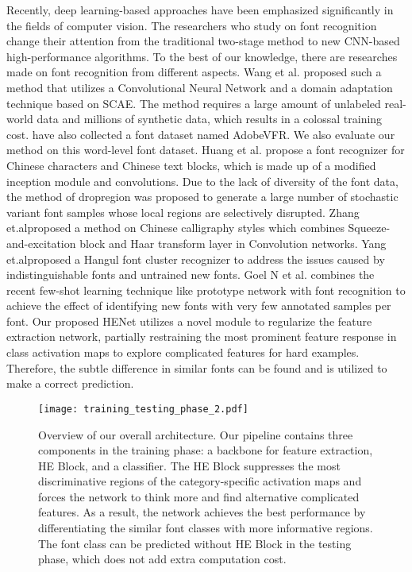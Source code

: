 \documentclass[manuscript,screen]{acmart}
\begin{document}
Recently, deep learning-based approaches have been emphasized significantly in the fields of computer vision. The researchers who study on font recognition change their attention from the traditional two-stage method to new CNN-based high-performance algorithms. To the best of our knowledge, there are researches made on font recognition from different aspects. Wang et al. \cite{wang_deepfont_2015} proposed such a method that utilizes a Convolutional Neural Network and a domain adaptation technique based on SCAE. The method requires a large amount of unlabeled real-world data and millions of synthetic data, which results in a colossal training cost. \cite{wang_deepfont_2015} have also collected a font dataset named AdobeVFR. We also evaluate our method on this word-level font dataset. Huang et al. \cite{huang_dropregion_2018} propose a font recognizer for Chinese characters and Chinese text blocks, which is made up of a modified inception module and convolutions. Due to the lack of diversity of the font data, the method of dropregion was proposed to generate a large number of stochastic variant font samples whose local regions are selectively disrupted. Zhang et.al\cite{DBLP:journals/ijdar/ZhangGF19}proposed a method on Chinese calligraphy styles which combines Squeeze-and-excitation block and Haar transform layer in Convolution networks. Yang et.al\cite{DBLP:journals/ijdar/YangKKK19}proposed a Hangul font cluster recognizer to address the issues caused by indistinguishable fonts and untrained new fonts. Goel N et al. \cite{Goel_2020_CVPR_Workshops} combines the recent few-shot learning technique like prototype network with font recognition to achieve the effect of identifying new fonts with very few annotated samples per font. Our proposed HENet utilizes a novel module to regularize the feature extraction network, partially restraining the most prominent feature response in class activation maps to explore complicated features for hard examples. Therefore, the subtle difference in similar fonts can be found and is utilized to make a correct prediction.



\begin{figure}[ht]
\centering
\texttt{[image: training\_testing\_phase\_2.pdf]}
\caption{Overview of our overall architecture. Our pipeline contains three components in the training phase: a backbone for feature extraction, HE Block, and a classifier. The HE Block suppresses the most discriminative regions of the category-specific activation maps and forces the network to think more and find alternative complicated features. As a result, the network achieves the best performance by differentiating the similar font classes with more informative regions. The font class can be predicted without HE Block in the testing phase, which does not add extra computation cost.}
\label{fig2}
\end{figure}
\end{document}
